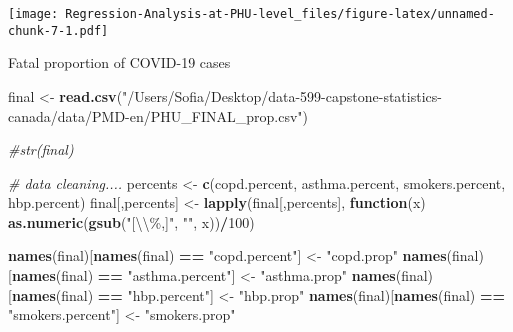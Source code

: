 \documentclass[]{article}
\newenvironment{Shaded}{\begin{snugshade}}{\end{snugshade}}
\newcommand{\CharTok}[1]{\textcolor[rgb]{0.31,0.60,0.02}{#1}}
\newcommand{\CommentTok}[1]{\textcolor[rgb]{0.56,0.35,0.01}{\textit{#1}}}
\newcommand{\ControlFlowTok}[1]{\textcolor[rgb]{0.13,0.29,0.53}{\textbf{#1}}}
\newcommand{\DataTypeTok}[1]{\textcolor[rgb]{0.13,0.29,0.53}{#1}}
\newcommand{\DecValTok}[1]{\textcolor[rgb]{0.00,0.00,0.81}{#1}}
\newcommand{\KeywordTok}[1]{\textcolor[rgb]{0.13,0.29,0.53}{\textbf{#1}}}
\newcommand{\NormalTok}[1]{#1}
\newcommand{\OperatorTok}[1]{\textcolor[rgb]{0.81,0.36,0.00}{\textbf{#1}}}
\newcommand{\OtherTok}[1]{\textcolor[rgb]{0.56,0.35,0.01}{#1}}
\newcommand{\StringTok}[1]{\textcolor[rgb]{0.31,0.60,0.02}{#1}}
\begin{document}
\begin{Shaded}
\end{Shaded}

\texttt{[image: Regression-Analysis-at-PHU-level\_files/figure-latex/unnamed-chunk-7-1.pdf]}

Fatal proportion of COVID-19 cases

\begin{Shaded}
\begin{Highlighting}[]
\NormalTok{final \textless{}{-}}\StringTok{ }\KeywordTok{read.csv}\NormalTok{(}\StringTok{"/Users/Sofia/Desktop/data{-}599{-}capstone{-}statistics{-}canada/data/PMD{-}en/PHU\_FINAL\_prop.csv"}\NormalTok{)}

\CommentTok{\#str(final)}


\CommentTok{\# data cleaning....}
\NormalTok{percents \textless{}{-}}\StringTok{ }\KeywordTok{c}\NormalTok{(}\StringTok{\textquotesingle{}copd.percent\textquotesingle{}}\NormalTok{, }\StringTok{\textquotesingle{}asthma.percent\textquotesingle{}}\NormalTok{, }\StringTok{\textquotesingle{}smokers.percent\textquotesingle{}}\NormalTok{, }\StringTok{\textquotesingle{}hbp.percent\textquotesingle{}}\NormalTok{)}
\NormalTok{final[,percents] \textless{}{-}}\StringTok{ }\KeywordTok{lapply}\NormalTok{(final[,percents], }\ControlFlowTok{function}\NormalTok{(x) }\KeywordTok{as.numeric}\NormalTok{(}\KeywordTok{gsub}\NormalTok{(}\StringTok{"[}\CharTok{\textbackslash{}\textbackslash{}}\StringTok{\%,]"}\NormalTok{, }\StringTok{""}\NormalTok{, x))}\OperatorTok{/}\DecValTok{100}\NormalTok{)}

\KeywordTok{names}\NormalTok{(final)[}\KeywordTok{names}\NormalTok{(final) }\OperatorTok{==}\StringTok{ "copd.percent"}\NormalTok{] \textless{}{-}}\StringTok{ "copd.prop"}
\KeywordTok{names}\NormalTok{(final)[}\KeywordTok{names}\NormalTok{(final) }\OperatorTok{==}\StringTok{ "asthma.percent"}\NormalTok{] \textless{}{-}}\StringTok{ "asthma.prop"}
\KeywordTok{names}\NormalTok{(final)[}\KeywordTok{names}\NormalTok{(final) }\OperatorTok{==}\StringTok{ "hbp.percent"}\NormalTok{] \textless{}{-}}\StringTok{ "hbp.prop"}
\KeywordTok{names}\NormalTok{(final)[}\KeywordTok{names}\NormalTok{(final) }\OperatorTok{==}\StringTok{ "smokers.percent"}\NormalTok{] \textless{}{-}}\StringTok{ "smokers.prop"}


\end{Highlighting}
\end{Shaded}
\end{document}
